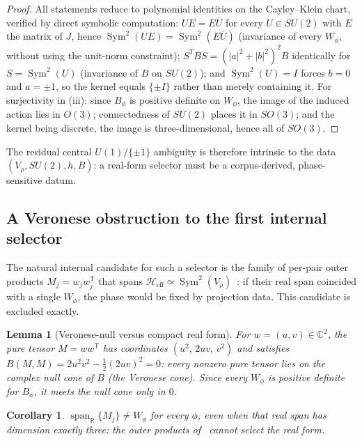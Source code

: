 \documentclass[11pt,a4paper]{article}
\newtheorem{lemma}{Lemma}
\newtheorem{corollary}{Corollary}
\begin{document}
\begin{proof}
All statements reduce to polynomial identities on the Cayley--Klein chart, verified by direct symbolic
computation: $U E = E \overline{U}$ for every $U \in SU(2)$ with $E$ the matrix of $J$, hence
$\operatorname{Sym}^2(U E) = \operatorname{Sym}^2(E \overline{U})$ (invariance of every $W_\phi$,
without using the unit-norm constraint); $S^T B S = (|a|^2 + |b|^2)^2 B$ identically for
$S = \operatorname{Sym}^2(U)$ (invariance of $B$ on $SU(2)$); and $\operatorname{Sym}^2(U) = I$ forces
$b = 0$ and $a = \pm 1$, so the kernel equals $\{\pm I\}$ rather than merely containing it.
For surjectivity in (iii): since $B_\phi$ is positive definite on $W_\phi$, the image of the induced
action lies in $O(3)$; connectedness of $SU(2)$ places it in $SO(3)$; and the kernel being discrete, the
image is three-dimensional, hence all of $SO(3)$.
\end{proof}

The residual central $U(1)/\{\pm 1\}$ ambiguity is therefore intrinsic to the data
$(V_\rho, SU(2), h, B)$: a real-form selector must be a corpus-derived, phase-sensitive datum.

\subsection{A Veronese obstruction to the first internal selector}
\label{sec:veronese}

The natural internal candidate for such a selector is the family of per-pair outer products
$M_j = w_j w_j^{\mathsf{T}}$ that spans $\mathcal{H}_{\mathrm{eff}} \simeq
\operatorname{Sym}^2(V_\rho)$~\cite{Beau2026a32}: if their real span coincided with a single $W_\phi$,
the phase would be fixed by projection data.
This candidate is excluded exactly.

\begin{lemma}[Veronese-null versus compact real form]
\label{lem:veronese}
For $w = (u, v) \in \mathbb{C}^2$, the pure tensor $M = w w^{\mathsf{T}}$ has coordinates
$(u^2,\, 2uv,\, v^2)$ and satisfies $B(M, M) = 2 u^2 v^2 - \tfrac12 (2uv)^2 = 0$: every nonzero pure
tensor lies on the complex null cone of $B$ (the Veronese cone).
Since every $W_\phi$ is positive definite for $B_\phi$, it meets the null cone only in $0$.
\end{lemma}

\begin{corollary}
\label{cor:noselector}
$\operatorname{span}_{\mathbb{R}}\{M_j\} \neq W_\phi$ for every $\phi$, even when that real span has
dimension exactly three: the outer products of~\cite{Beau2026a32} cannot select the real form.
\end{corollary}
\end{document}
